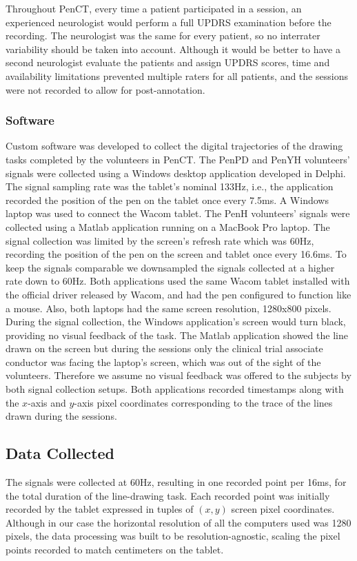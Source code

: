 Throughout \gls{PenCT}, every time a patient participated in a session, an experienced neurologist would perform a full \gls{UPDRS} examination before the recording. The neurologist was the same for every patient, so no interrater variability should be taken into account. Although it would be better to have a second neurologist evaluate the patients and assign \gls{UPDRS} scores, time and availability limitations prevented multiple raters for all patients, and the sessions were not recorded to allow for post-annotation.
  
\subsubsection{Software}
\label{subsubsec:PenCTSoftware}
Custom software was developed to collect the digital trajectories of the drawing tasks completed by the volunteers in \gls{PenCT}. The \gls{PenPD} and \gls{PenYH} volunteers' signals were collected using a Windows desktop application developed in Delphi. The signal sampling rate was the tablet's nominal 133Hz, i.e., the application recorded the position of the pen on the tablet once every 7.5ms. A Windows laptop was used to connect the Wacom tablet. The \gls{PenH} volunteers' signals were collected using a Matlab application running on a MacBook Pro laptop. The signal collection was limited by the screen's refresh rate which was 60Hz, recording the position of the pen on the screen and tablet once every 16.6ms. To keep the signals comparable we downsampled the signals collected at a higher rate down to 60Hz. Both applications used the same Wacom tablet installed with the official driver released by Wacom, and had the pen configured to function like a mouse. Also, both laptops had the same screen resolution, 1280x800 pixels. During the signal collection, the Windows application's screen would turn black, providing no visual feedback of the task. The Matlab application showed the line drawn on the screen but during the sessions only the clinical trial associate conductor was facing the laptop's screen, which was out of the sight of the volunteers. Therefore we assume no visual feedback was offered to the subjects by both signal collection setups. Both applications recorded timestamps along with the $x$-axis and $y$-axis pixel coordinates corresponding to the trace of the lines drawn during the sessions. 

\subsection{Data Collected}
\label{subsec:PenCTData}
The signals were collected at 60Hz, resulting in one recorded point per 16ms, for the total duration of the line-drawing task. Each recorded point was initially recorded by the tablet expressed in tuples of $(x,y)$ screen pixel coordinates. Although in our case the horizontal resolution of all the computers used was 1280 pixels, the data processing was built to be resolution-agnostic, scaling the pixel points recorded to match centimeters on the tablet. 

